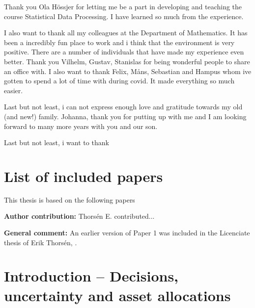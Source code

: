 \documentclass[oneside]{book}\usepackage{knitr}
\begin{document}
Thank you Ola Hössjer for letting me be a part in developing and teaching the course Statistical Data Processing.
I have learned so much from the experience.

I also want to thank all my colleagues at the Department of Mathematics.
It has been a incredibly fun place to work and i think that the environment is very positive.
There are a number of individuals that have made my experience even better.
Thank you Vilhelm, Gustav, Stanislas for being wonderful people to share an office with.
I also want to thank Felix, Måns, Sebastian and Hampus whom ive gotten to spend a lot of time with during covid. 
It made everything so much easier.

Last but not least, i can not express enough love and gratitude towards my old (and new!) family. Johanna, thank you for putting up with me and I am looking forward to many more years with you and our son. 




Last but not least, i want to thank 
\newpage
\chapter*{List of included papers}
\nocite{bodnar2020sampling, javed2021tangency, bodnar2021dynamic, bodnar2021empirical, bodnar2022double}
This thesis is based on the following papers

\printbibliography[keyword=included_in_thesis, title={Papers included in this thesis}, heading=subbibliography]
\printbibliography[keyword=papers_list, title={Papers \& other research results which are not included in this thesis},
heading=subbibliography]

\textbf{Author contribution:} Thors{\'e}n E. contributed...

\textbf{General comment:} An earlier version of Paper 1 was included in the Licenciate thesis of Erik Thors\'en, \citet{thorsen2019assessment}. 

%  


\tableofcontents
\chapter[Introduction]{Introduction -- Decisions, uncertainty and asset allocations}\label{ch:intro}

\end{document}
